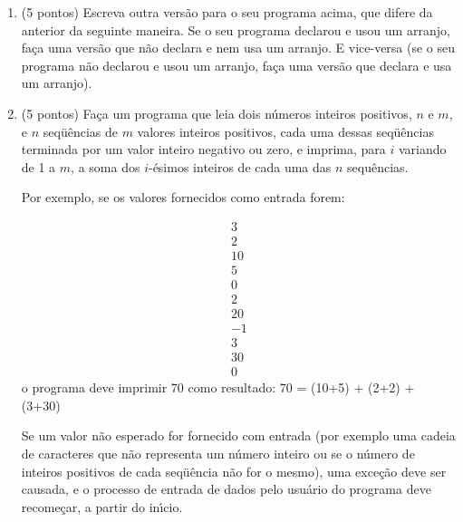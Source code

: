 \begin{enumerate}
Em cada situa\c{c}\~ao de entrada de dados, se um valor n\~ao esperado
for fornecido com entrada (por exemplo uma cadeia de caracteres que
n\~ao representa um n\'umero inteiro), uma exce\c{c}\~ao deve ser
causada, e o processo de entrada de dados pelo usu\'ario do programa
deve recome\c{c}ar, a partir do in\'{\i}cio (isto \'e, a partir da
leitura de $n$). 

Dica 1: o m\'etodo {\it parseInt\/} causa a exce\c{c}\~ao {\it
NumberFormatException\/} se a cadeia de caracteres fornecida como
argumento n\~ao representar um n\'umero inteiro.

Dica 2: N\~ao esque\c{c}a de testar se o primeiro valor lido (de $n$)
\'e um valor positivo, e causar uma exce\c{c}\~ao em caso contr\'ario. 

\item (5 pontos) Escreva outra vers\~ao para o seu programa acima, que
difere da anterior da seguinte maneira. Se o seu programa declarou e
usou um arranjo, fa\c{c}a uma vers\~ao que n\~ao declara e nem usa um
arranjo. E vice-versa (se o seu programa n\~ao declarou e usou um
arranjo, fa\c{c}a uma vers\~ao que declara e usa um arranjo).

\item (5 pontos) Fa\c{c}a um programa que leia dois n\'umeros inteiros
positivos, $n$ e $m$, e $n$ seq\"u\^encias de $m$ valores inteiros
positivos, cada uma dessas seq\"u\^encias terminada por um valor
inteiro negativo ou zero, e imprima, para $i$ variando de 1 a $m$, a
soma dos $i$-\'esimos inteiros de cada uma das $n$ sequ\^encias.

Por exemplo, se os valores fornecidos como entrada forem:
  
  \[ \begin{array}{l}
        3    \\
        2    \\
        10   \\
        5    \\
        0    \\
        2    \\
        20   \\
        -1   \\
        3    \\
        30   \\
        0
      \end{array} \]
o programa deve imprimir 70 como resultado: 
  70 = (10+5) + (2+2) + (3+30) 

Se um valor n\~ao esperado for fornecido com entrada (por exemplo uma
cadeia de caracteres que n\~ao representa um n\'umero inteiro ou se o
n\'umero de inteiros positivos de cada seq\"u\^encia n\~ao for o
mesmo), uma exce\c{c}\~ao deve ser causada, e o processo de entrada de
dados pelo usu\'ario do programa deve recome\c{c}ar, a partir do
in\'{\i}cio.

\end{enumerate}



